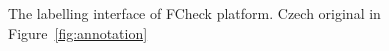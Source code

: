 \begin{figure}
\vspace{-2cm}
\caption[English Translation of Figure~\ref{fig:annotation}]{The labelling interface of \textsf{FCheck} platform. Czech original in Figure~\ref{fig:annotation}}
\label{trans:annotation}
\end{figure}

